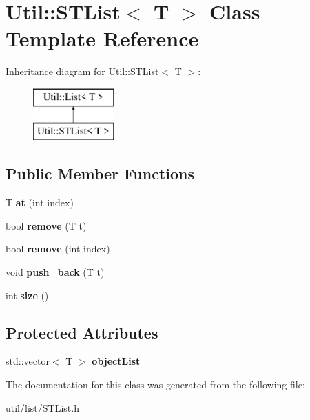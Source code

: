 \hypertarget{class_util_1_1_s_t_list}{}\section{Util\+:\+:S\+T\+List$<$ T $>$ Class Template Reference}
\label{class_util_1_1_s_t_list}
Inheritance diagram for Util\+:\+:S\+T\+List$<$ T $>$\+:\begin{figure}[H]
\begin{center}
\leavevmode
\includegraphics[height=2.000000cm]{class_util_1_1_s_t_list}
\end{center}
\end{figure}
\subsection*{Public Member Functions}
\begin{DoxyCompactItemize}
\item 
\mbox{\label{class_util_1_1_s_t_list_a36b94b6bf675f12a3561c0d256c7e0de}} 
T {\bfseries at} (int index)
\item 
\mbox{\label{class_util_1_1_s_t_list_a58dc4769b737fa74d100ca0061504587}} 
bool {\bfseries remove} (T t)
\item 
\mbox{\label{class_util_1_1_s_t_list_a4bff8c08bb5c2299ffbf92be54eb5b42}} 
bool {\bfseries remove} (int index)
\item 
\mbox{\label{class_util_1_1_s_t_list_a117b785fc13aeaa4aaeaf292877d1823}} 
void {\bfseries push\+\_\+back} (T t)
\item 
\mbox{\label{class_util_1_1_s_t_list_aa1193cc40023b76ddf6c158d63737994}} 
int {\bfseries size} ()
\end{DoxyCompactItemize}
\subsection*{Protected Attributes}
\begin{DoxyCompactItemize}
\item 
\mbox{\label{class_util_1_1_s_t_list_ab9b34ca152516f0db1c212ce9ad1e9cf}} 
std\+::vector$<$ T $>$ {\bfseries object\+List}
\end{DoxyCompactItemize}


The documentation for this class was generated from the following file\+:\begin{DoxyCompactItemize}
\item 
util/list/S\+T\+List.\+h\end{DoxyCompactItemize}
